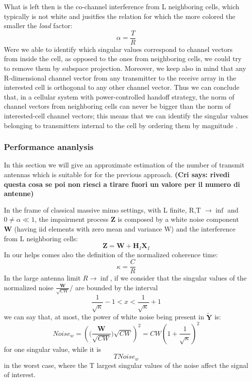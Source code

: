 \documentclass[11pt]{book}
\newcommand{\cri}[1]{\textcolor{MyColor2}{\textbf{(Cri says: #1)}}}
\begin{document}
What is left then is the co-channel interference from L neighboring cells, which typically is not white and jusitfies the relation for which the more colored the smaller the \textit{load} factor:
\begin{equation}
  \alpha = \frac{T}{R}
\end{equation}
Were we able to identify which singular values correspond to channel vectors from inside the cell, as opposed to the ones from neighboring cells, we could try to remove them by subspace projection. Moreover, we keep also in mind that any R-dimensional channel vector from any transmitter to the receive array in the interested cell is orthogonal to any other channel vector. Thus we can conclude that, in a cellular system with power-controlled handoff strategy, the norm of channel vectors from neighboring cells can never be bigger than the norm of interested-cell channel vectors; this means that we can identify the singular values belonging to transmitters internal to the cell by ordering them by magnitude \cite{Ralf}.
\subsubsection{Performance ananlysis}
In this section we will give an approximate estimation of the number of transmit antennas which is suitable for for the previous approach. \cri{rivedi questa cosa se poi non riesci a tirare fuori un valore per il numero di antenne}

In the frame of classical massive \gls{mimo} settings, with L finite, R,T $\rightarrow \inf$ and $0 \neq \alpha \ll 1$, the impairment process $\mathbf{Z}$ is composed by a white noise component $\mathbf{W}$ (having iid elements with zero mean and variance W) and the interference from L neighboring cells:
\begin{equation}
  \mathbf{Z} = \mathbf{W} + \mathbf{H}_I\mathbf{X}_I
\end{equation}
In our helps comes also the definition of the normalized coherence time:
\begin{equation}
  \kappa = \frac{C}{R}
\end{equation}
In the large antenna limit $R \rightarrow \inf$, if we consider that the singular values of the normalized noise $\frac{\mathbf{W}}{\sqrt{CW}}/$ are bounded by the interval
\begin{equation}
  \frac{1}{\sqrt{\kappa}} - 1 < x < \frac{1}{\sqrt{\kappa}} + 1
\end{equation}
we can say that, at most, the power of white noise being present in $\mathbf{\tilde{Y}}$ is:
\begin{equation}
  Noise_w = \left(\Big(\frac{\mathbf{W}}{\sqrt{CW}}\Big)\sqrt{CW}\right)^2 = CW\left(1+\frac{1}{\sqrt{\kappa}}\right)^2
\end{equation}
for one singular value, while it is
\begin{equation}
  TNoise_w
\end{equation}
in the worst case, where the T largest singular values of the noise affect the signal of interest.
\end{document}
